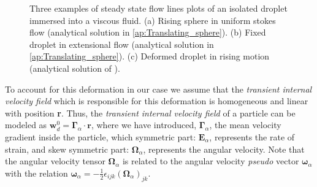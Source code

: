 \begin{figure}
    \centering
    \caption{Three examples of steady state flow lines plots of an isolated droplet immersed into a viscous fluid. 
    (a) Rising sphere in uniform stokes flow (analytical solution in \ref{ap:Translating_sphere}). 
    (b) Fixed droplet in extensional flow (analytical solution in \ref{ap:Translating_sphere}).
    (c) Deformed droplet in rising motion (analytical solution of \citet{taylor1964deformation}). }
    \label{fig:flowlines}
\end{figure} 
To account for this deformation in our case we assume that the \textit{transient internal velocity field} which is responsible for this deformation is homogeneous and linear with position \textbf{r}. 
Thus, the \textit{transient internal velocity field} of a particle can be modeled as $\textbf{w}_d^0 = \bm\Gamma_\alpha \cdot \textbf{r}$, where we have introduced, $\bm\Gamma_\alpha$, the mean velocity gradient inside the particle, which symmetric part: $\textbf{E}_\alpha$, represents the rate of strain, and skew symmetric part: $\bm\Omega_\alpha$, represents the angular velocity. 
Note that the angular velocity tensor $\bm\Omega_\alpha$ is related to the angular velocity \textit{pseudo} vector $\bm\omega_\alpha$ with the relation $\bm\omega_\alpha = -\frac{1}{2}\epsilon_{ijk} (\bm\Omega_\alpha)_{jk}$. 

